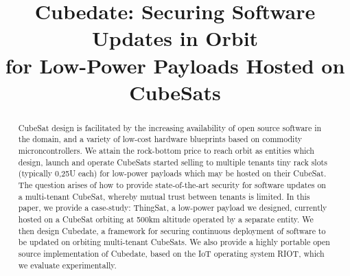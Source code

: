 \documentclass[conference]{IEEEtran}
\begin{document}

\title{Cubedate: Securing Software Updates in Orbit \\ for Low-Power Payloads Hosted on CubeSats}

\author{
\and
{}
}

\maketitle

\begin{abstract}

CubeSat design is facilitated by the increasing availability of open source software in the domain, and a variety of low-cost hardware blueprints based on commodity microncontrollers.
We attain the rock-bottom price to reach orbit as entities which design, launch and operate CubeSats started selling to multiple tenants tiny rack slots (typically 0,25U each) for low-power payloads which may be hosted on their CubeSat.
The question arises of how to provide state-of-the-art security for software updates on a multi-tenant CubeSat, whereby mutual trust between tenants is limited.
In this paper, we provide a case-study: ThingSat, a low-power payload we designed, currently hosted on a CubeSat orbiting at 500km altitude operated by a separate entity.
We then design Cubedate, a framework for securing continuous deployment of software to be updated on orbiting multi-tenant CubeSats.
We also provide a highly portable open source implementation of Cubedate, based on the IoT operating system RIOT, which we evaluate experimentally.%
\end{abstract}

\IEEEpeerreviewmaketitle












\end{document}
